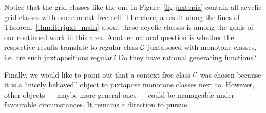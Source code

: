 \documentclass[12pt, a4paper, twoside]{report}
\begin{document}



Notice that the grid classes like the one in Figure~\ref{fig:juxtopia} contain all acyclic grid classes with one context-free cell. Therefore, a result along the lines of Theorem~\ref{thm:iterjuxt_main} about these acyclic classes is among the goals of our continued work in this area. Another natural question is whether the respective results translate to regular class $\mathcal{C}$ juxtaposed with monotone classes, i.e. are such juxtapositions regular? Do they have rational generating functions?

Finally, we would like to point out that a context-free class $\mathcal{C}$ was chosen because it is a ``nicely behaved'' object to juxtapose monotone classes next to. However, other objects --- maybe more general ones --- could be manageable under favourable circumstances. It remains a direction to pursue. 
\end{document}

